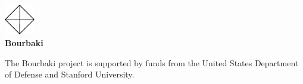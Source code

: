 




\setcounter{tocdepth}{1}
\usepackage{tocloft}
\setlength{\cftsecnumwidth}{3em}



\begin{center}
  \includegraphics[width=0.1\textwidth]{../trademark}
  \\
  \vspace{0.5cm}
  {\selectfont \LARGE \textbf{Bourbaki} }
\end{center}

\vspace{\fill}

\begin{center}
The Bourbaki project is supported
by funds from the United States
Department of Defense and
Stanford University.
\end{center}

\clearpage

\tableofcontents

\clearpage




